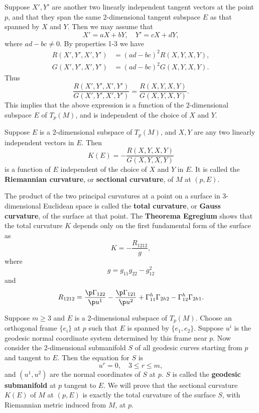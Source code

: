 \documentclass[11pt]{article}
\begin{document}
Suppose $X', Y'$ are another two linearly independent tangent vectors at the point $p$, and that they span the same 2-dimensional tangent subspace $E$ as that spanned by $X$ and $Y$. Then we may assume that $$X' = aX + bY, \quad Y' = cX + dY,$$ where $ad - bc \neq 0$. By properties 1-3 we have
\begin{align*}
    R(X', Y', X', Y') &= (ad - bc)^2R(X, Y, X, Y), \\
    G(X', Y', X', Y') &= (ad - bc)^2G(X, Y, X, Y).
\end{align*}
Thus $$\frac{R(X', Y', X', Y')}{G(X', Y', X', Y')} = \frac{R(X, Y, X, Y)}{G(X, Y, X, Y)}.$$ This implies that the above expression is a function of the 2-dimensional subspace $E$ of $T_p(M)$, and is independent of the choice of $X$ and $Y$.

\begin{definition}
    Suppose $E$ is a 2-dimensional subspace of $T_p(M)$, and $X, Y$ are any two linearly independent vectors in $E$. Then $$K(E) = -\frac{R(X, Y, X, Y)}{G(X, Y, X, Y)}$$ is a function of $E$ independent of the choice of $X$ and $Y$ in $E$. It is called the \textbf{Riemannian curvature}, or \textbf{sectional curvature}, of $M$ at $(p, E)$. 
\end{definition}

The product of the two principal curvatures at a point on a surface in 3-dimensional Euclidean space is called the \textbf{total curvature}, or \textbf{Gauss curvature}, of the surface at that point. The \textbf{Theorema Egregium} shows that the total curvature $K$ depends only on the first fundamental form of the surface as $$K = -\frac{R_{1212}}{g},$$ where $$g = g_{11}g_{22}-g_{12}^2$$ and $$R_{1212} = \frac{\p\Gamma_{122}}{\p u^1} - \frac{\p\Gamma_{121}}{\p u^2} + \Gamma^h_{11}\Gamma_{2h2} - \Gamma^h_{12}\Gamma_{2h1}.$$

Suppose $m \ge 3$ and $E$ is a 2-dimensional subspace of $T_p(M)$. Choose an orthogonal frame $\{e_i\}$ at $p$ such that $E$ is spanned by $\{e_1, e_2\}$. Suppose $u^i$ is the geodesic normal coordinate system determined by this frame near $p$. Now consider the 2-dimensional submanifold $S$ of all geodesic curves starting from $p$ and tangent to $E$. Then the equation for $S$ is $$u^r = 0, \quad 3 \le r \le m,$$ and $(u^1, u^2)$ are the normal coordinates of $S$ at $p$. $S$ is called the \textbf{geodesic submanifold} at $p$ tangent to $E$. We will prove that the sectional curvature $K(E)$ of $M$ at $(p, E)$ is exactly the total curvature of the surface $S$, with Riemannian metric induced from $M$, at $p$. 
\end{document}

